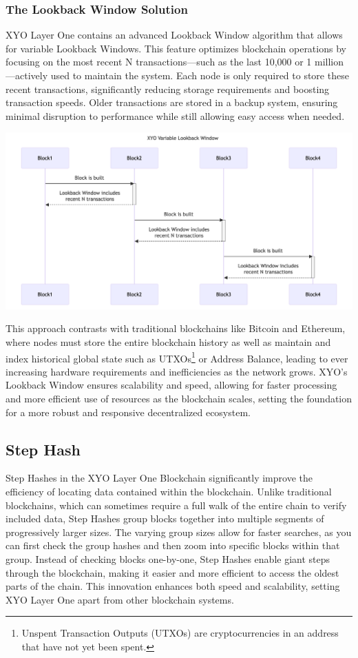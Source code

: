\documentclass{article}
\begin{document}
\subsubsection{The Lookback Window Solution}
XYO Layer One contains an advanced Lookback Window algorithm that allows for variable Lookback Windows. This feature optimizes blockchain operations by focusing on the most recent N transactions—such as the last 10,000 or 1 million—actively used to maintain the system. Each node is only required to store these recent transactions, significantly reducing storage requirements and boosting transaction speeds. Older transactions are stored in a backup system, ensuring minimal disruption to performance while still allowing easy access when needed. 

\begin{center}
    \includegraphics[width=15cm]{xyo-variable-lookback-window.png}
\end{center}

This approach contrasts with traditional blockchains like Bitcoin and Ethereum, where nodes must store the entire blockchain history as well as maintain and index historical global state such as UTXOs\footnote{Unspent Transaction Outputs (UTXOs) are cryptocurrencies in an address that have not yet been spent.} or Address Balance, leading to ever increasing hardware requirements and inefficiencies as the network grows. XYO's Lookback Window ensures scalability and speed, allowing for faster processing and more efficient use of resources as the blockchain scales, setting the foundation for a more robust and responsive decentralized ecosystem. 


\subsection{Step Hash}
Step Hashes in the XYO Layer One Blockchain significantly improve the efficiency of locating data contained within the blockchain. Unlike traditional blockchains, which can sometimes require a full walk of the entire chain to verify included data, Step Hashes group blocks together into multiple segments of progressively larger sizes. The varying group sizes allow for faster searches, as you can first check the group hashes and then zoom into specific blocks within that group. Instead of checking blocks one-by-one, Step Hashes enable giant steps through the blockchain, making it easier and more efficient to access the oldest parts of the chain. This innovation enhances both speed and scalability, setting XYO Layer One apart from other blockchain systems.
\end{document}
